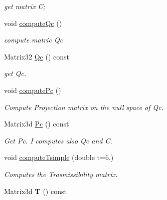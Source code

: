 \begin{DoxyCompactItemize}
\begin{DoxyCompactList}\small\item\em get matrix C; \end{DoxyCompactList}\item 
void \hyperlink{classDarcy_1_1Biforc_a1cab51fc0e6a7a4f87f96861a2fdaeb4}{compute\-Qc} ()
\begin{DoxyCompactList}\small\item\em compute matric Qc \end{DoxyCompactList}\item 
\hypertarget{classDarcy_1_1Biforc_a9b8f6f2c9b2b740d2b02ddb47690c431}{Matrix32 \hyperlink{classDarcy_1_1Biforc_a9b8f6f2c9b2b740d2b02ddb47690c431}{Qc} () const }\label{classDarcy_1_1Biforc_a9b8f6f2c9b2b740d2b02ddb47690c431}

\begin{DoxyCompactList}\small\item\em get Qc. \end{DoxyCompactList}\item 
\hypertarget{classDarcy_1_1Biforc_a17cd51ee8740b7898bf6b50953c68ccc}{void \hyperlink{classDarcy_1_1Biforc_a17cd51ee8740b7898bf6b50953c68ccc}{compute\-Pc} ()}\label{classDarcy_1_1Biforc_a17cd51ee8740b7898bf6b50953c68ccc}

\begin{DoxyCompactList}\small\item\em Compute Projection matrix on the null space of Qc. \end{DoxyCompactList}\item 
\hypertarget{classDarcy_1_1Biforc_a617a47a860e60ddf074e2c309c612ac4}{Matrix3d \hyperlink{classDarcy_1_1Biforc_a617a47a860e60ddf074e2c309c612ac4}{Pc} () const }\label{classDarcy_1_1Biforc_a617a47a860e60ddf074e2c309c612ac4}

\begin{DoxyCompactList}\small\item\em Get Pc. I computes also Qc and C. \end{DoxyCompactList}\item 
void \hyperlink{classDarcy_1_1Biforc_ae641e782a677c39798bf23dd813f7949}{compute\-Tsimple} (double t=6.)
\begin{DoxyCompactList}\small\item\em Computes the Trasmissibility matrix. \end{DoxyCompactList}\item 
\hypertarget{classDarcy_1_1Biforc_a7c1311c8c0e36efbf4b15ec7ce9b046b}{Matrix3d {\bfseries T} () const }\label{classDarcy_1_1Biforc_a7c1311c8c0e36efbf4b15ec7ce9b046b}

\end{DoxyCompactItemize}


